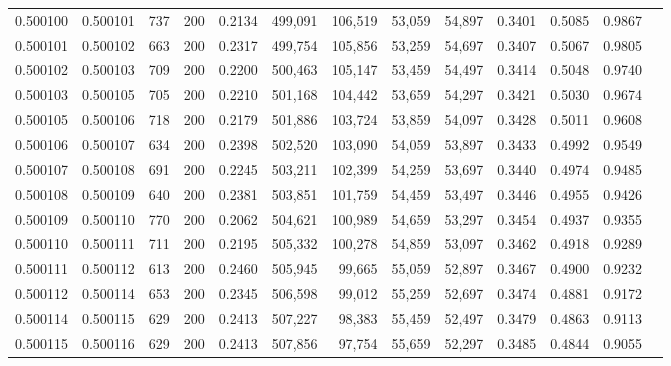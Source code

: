 \begin{tabular}{rrrrrrrrrrrrr}
0.500100 & 0.500101 &    737 & 200 &                                     0.2134 & 499,091 & 106,519 &  53,059 &  54,897 & 0.3401 & 0.5085 & 0.9867 \\
0.500101 & 0.500102 &    663 & 200 &                                     0.2317 & 499,754 & 105,856 &  53,259 &  54,697 & 0.3407 & 0.5067 & 0.9805 \\
0.500102 & 0.500103 &    709 & 200 &                                     0.2200 & 500,463 & 105,147 &  53,459 &  54,497 & 0.3414 & 0.5048 & 0.9740 \\
0.500103 & 0.500105 &    705 & 200 &                                     0.2210 & 501,168 & 104,442 &  53,659 &  54,297 & 0.3421 & 0.5030 & 0.9674 \\
0.500105 & 0.500106 &    718 & 200 &                                     0.2179 & 501,886 & 103,724 &  53,859 &  54,097 & 0.3428 & 0.5011 & 0.9608 \\
0.500106 & 0.500107 &    634 & 200 &                                     0.2398 & 502,520 & 103,090 &  54,059 &  53,897 & 0.3433 & 0.4992 & 0.9549 \\
0.500107 & 0.500108 &    691 & 200 &                                     0.2245 & 503,211 & 102,399 &  54,259 &  53,697 & 0.3440 & 0.4974 & 0.9485 \\
0.500108 & 0.500109 &    640 & 200 &                                     0.2381 & 503,851 & 101,759 &  54,459 &  53,497 & 0.3446 & 0.4955 & 0.9426 \\
0.500109 & 0.500110 &    770 & 200 &                                     0.2062 & 504,621 & 100,989 &  54,659 &  53,297 & 0.3454 & 0.4937 & 0.9355 \\
0.500110 & 0.500111 &    711 & 200 &                                     0.2195 & 505,332 & 100,278 &  54,859 &  53,097 & 0.3462 & 0.4918 & 0.9289 \\
0.500111 & 0.500112 &    613 & 200 &                                     0.2460 & 505,945 &  99,665 &  55,059 &  52,897 & 0.3467 & 0.4900 & 0.9232 \\
0.500112 & 0.500114 &    653 & 200 &                                     0.2345 & 506,598 &  99,012 &  55,259 &  52,697 & 0.3474 & 0.4881 & 0.9172 \\
0.500114 & 0.500115 &    629 & 200 &                                     0.2413 & 507,227 &  98,383 &  55,459 &  52,497 & 0.3479 & 0.4863 & 0.9113 \\
0.500115 & 0.500116 &    629 & 200 &                                     0.2413 & 507,856 &  97,754 &  55,659 &  52,297 & 0.3485 & 0.4844 & 0.9055 \\

\end{tabular}
